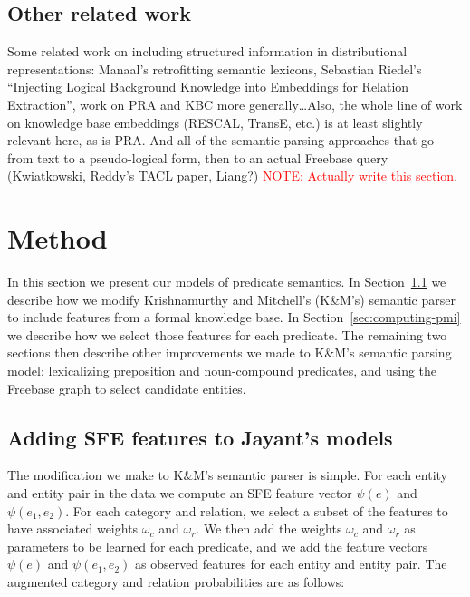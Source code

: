 \documentclass[11pt]{article}
\newcommand{\secref}[1]{Section~\ref{sec:#1}}
\newcommand{\mattnote}[1]{\textcolor{red}{NOTE: #1}}
\begin{document}
\subsection{Other related work}

Some related work on including structured information in distributional representations: Manaal's
retrofitting semantic lexicons, Sebastian Riedel's ``Injecting Logical Background Knowledge into
Embeddings for Relation Extraction'', work on PRA and KBC more generally\ldots Also, the whole line
of work on knowledge base embeddings (RESCAL, TransE, etc.) is at least slightly relevant here, as
is PRA.  And all of the semantic parsing approaches that go from text to a pseudo-logical form,
then to an actual Freebase query (Kwiatkowski, Reddy's TACL paper, Liang?) \mattnote{Actually write
this section}.

\section{Method}
\label{sec:method}

In this section we present our models of predicate semantics.  In
\secref{formal-and-distributional} we describe how we modify Krishnamurthy and
Mitchell's (K\&M's) semantic parser to include features from a formal knowledge
base.  In \secref{computing-pmi} we describe how we select those features for
each predicate.  The remaining two sections then describe other improvements we
made to K\&M's semantic parsing model: lexicalizing preposition and
noun-compound predicates, and using the Freebase graph to select candidate
entities.

\subsection{Adding SFE features to Jayant's models}
\label{sec:formal-and-distributional}

The modification we make to K\&M's semantic parser is simple.  For each entity
and entity pair in the data we compute an SFE feature vector $\psi(e)$ and
$\psi(e_1, e_2)$.  For each category and relation, we select a subset of the
features to have associated weights $\omega_c$ and $\omega_r$.  We then add the
weights $\omega_c$ and $\omega_r$ as parameters to be learned for each
predicate, and we add the feature vectors $\psi(e)$ and $\psi(e_1, e_2)$ as
observed features for each entity and entity pair.  The augmented category and
relation probabilities are as follows:
\end{document}
